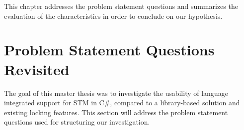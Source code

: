 



This chapter addresses the problem statement questions and summarizes the evaluation of the characteristics in order to conclude on our hypothesis. %

\label{chap:conclusion}

\section{Problem Statement Questions Revisited}
The goal of this master thesis was to investigate the usability of language integrated support for \ac{STM} in C\#, compared to a library-based solution and existing locking features. This section will address the problem statement questions used for structuring our investigation.

